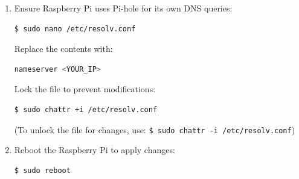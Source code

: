 \documentclass[a4paper,12pt]{article}
\begin{document}
\begin{enumerate}
    \item Ensure Raspberry Pi uses Pi-hole for its own DNS queries:
    \begin{lstlisting}[language=bash, breaklines=true, breakatwhitespace=true, columns=fullflexible]
    $ sudo nano /etc/resolv.conf
    \end{lstlisting}

    Replace the contents with:
    \begin{lstlisting}[language=bash, breaklines=true, breakatwhitespace=true, columns=fullflexible]
    nameserver <YOUR_IP>
    \end{lstlisting}

    Lock the file to prevent modifications:
    \begin{lstlisting}[language=bash, breaklines=true, breakatwhitespace=true, columns=fullflexible]
    $ sudo chattr +i /etc/resolv.conf
    \end{lstlisting}
 
    (To unlock the file for changes, use: \texttt{\$ sudo chattr -i /etc/resolv.conf})

    \item Reboot the Raspberry Pi to apply changes:
    \begin{lstlisting}[language=bash, breaklines=true, breakatwhitespace=true, columns=fullflexible]
    $ sudo reboot
    \end{lstlisting}

\end{enumerate}
\end{document}
